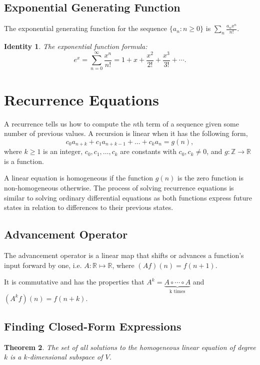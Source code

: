 \documentclass{article}
\newtheorem{theorem}{Theorem}[section]
\newtheorem{identity}[theorem]{Identity}
\begin{document}
\subsection{Exponential Generating Function}
The exponential generating function for the sequence $\{a_n\colon n\geq 0\}$ is $\displaystyle \sum_n \frac{a_n x^n}{n!}$.

\begin{identity}The exponential function formula:
\[
e^{x} =\sum _{n=0}^{\infty }{\frac {x^{n}}{n!}}=1+x+{\frac {x^{2}}{2!}}+{\frac {x^{3}}{3!}}+\cdots.
\]
\end{identity}

\section{Recurrence Equations}
A recurrence tells us how to compute the $n$th term of a sequence given some number of previous values. A recursion is linear when it has the following form,
\[
c_0a_{n+k}+ c_1a_{n+k-1} + \dots+c_ka_{n} = g(n),
\]
where $k \geq 1$ is an integer, $c_0,c_1,\dots,c_k$ are constants with $c_0, c_k \neq 0$, and $g: \mathbb Z \rightarrow \mathbb R$ is a function.

A linear equation is homogeneous if the function $g(n)$ is the zero function is non-homogeneous otherwise. The process of solving recurrence equations is similar to solving ordinary differential equations as both functions express future states in relation to differences to their previous states.

\subsection{Advancement Operator}
The advancement operator is a linear map that shifts or advances a function's input forward by one, i.e. $A: \mathbb R \mapsto \mathbb R$, where $(Af)(n) = f(n+1)$. 

It is commutative and has the properties that $A^k =  \underbrace{A \circ \cdots \circ A }_\text{k times}$ and $(A^k f)(n) = f(n+k)$.

\subsection{Finding Closed-Form Expressions}
\begin{theorem}
The set of all solutions to the homogeneous linear equation of degree $k$ is a $k$-dimensional subspace of $V$.
\end{theorem}
\end{document}
